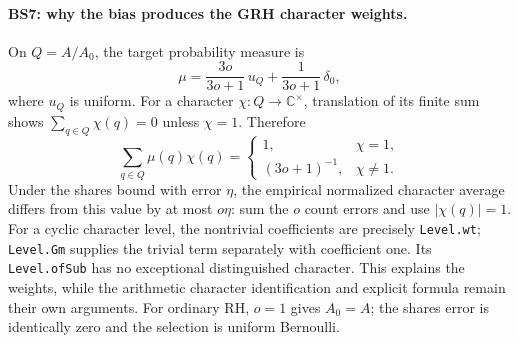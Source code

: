 \paragraph{BS7: why the bias produces the GRH character weights.}
On $Q=A/A_0$, the target probability measure is
\[
 \mu=\frac{3o}{3o+1}\,u_Q+\frac1{3o+1}\,\delta_0,
                                                        \tag{BS.9}
\]
where $u_Q$ is uniform. For a character $\chi:Q\to\mathbb C^\times$,
translation of its finite sum shows $\sum_{q\in Q}\chi(q)=0$
unless $\chi=1$. Therefore
\[
 \sum_{q\in Q}\mu(q)\chi(q)=
 \begin{cases}1,&\chi=1,\\(3o+1)^{-1},&\chi\ne1.\end{cases}
                                                        \tag{BS.10}
\]
Under the shares bound with error $\eta$, the empirical normalized
character average differs from this value by at most $o\eta$:
sum the $o$ count errors and use $|\chi(q)|=1$.
For a cyclic character level, the nontrivial coefficients are precisely
\texttt{Level.wt}; \texttt{Level.Gm} supplies the trivial term separately
with coefficient one. Its \texttt{Level.ofSub} has no exceptional
distinguished character.
This explains the weights, while the arithmetic character
identification and explicit formula remain their own arguments.
For ordinary RH, $o=1$ gives $A_0=A$; the shares error is identically
zero and the selection is uniform Bernoulli.
